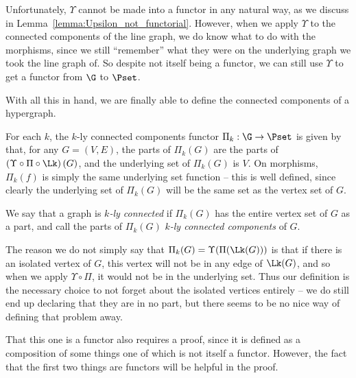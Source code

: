 \documentclass[a4paper,reqno,oneside]{article} %
\begin{document}
Unfortunately, $\Upsilon$ cannot be made into a functor in any natural way, as we discuss in Lemma~\ref{lemma:Upsilon_not_functorial}. However, when we apply $\Upsilon$ to the connected components of the line graph, we do know what to do with the morphisms, since we still ``remember'' what they were on the underlying graph we took the line graph of. So despite not itself being a functor, we can still use $\Upsilon$ to get a functor from $\G$ to $\Pset$.

With all this in hand, we are finally able to define the connected components of a hypergraph.

\begin{definition}
    For each $k$, the $k$-ly connected components functor $\Pi_k: \G \to \Pset$ is given by that, for any $G = (V,E)$, the parts of $\Pi_k(G)$ are the parts of $\left(\Upsilon \circ \Pi \circ \Lk\right)(G)$, and the underlying set of $\Pi_k(G)$ is $V$. On morphisms, $\Pi_k(f)$ is simply the same underlying set function -- this is well defined, since clearly the underlying set of $\Pi_k(G)$ will be the same set as the vertex set of $G$.

    We say that a graph is \emph{$k$-ly connected} if $\Pi_k(G)$ has the entire vertex set of $G$ as a part, and call the parts of $\Pi_k(G)$ \emph{$k$-ly connected components} of $G$.
\end{definition}

The reason we do not simply say that $\Pi_k(G) = \Upsilon(\Pi(\Lk(G)))$ is that if there is an isolated vertex of $G$, this vertex will not be in any edge of $\Lk(G)$, and so when we apply $\Upsilon \circ \Pi$, it would not be in the underlying set. Thus our definition is the necessary choice to not forget about the isolated vertices entirely -- we do still end up declaring that they are in no part, but there seems to be no nice way of defining that problem away.

That this one is a functor also requires a proof, since it is defined as a composition of some things one of which is not itself a functor. However, the fact that the first two things are functors will be helpful in the proof.
\end{document}
